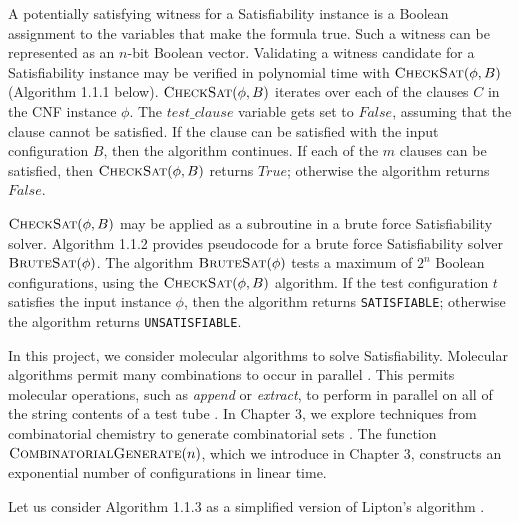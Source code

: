 A potentially satisfying witness for a {\sc Satisfiability} instance is a Boolean assignment to the variables that make the formula true.  Such a witness can be represented as an $n$-bit Boolean vector.  Validating a witness candidate for a {\sc Satisfiability} instance may be verified in polynomial time with $\text{\sc CheckSat}(\phi, B)$ (Algorithm 1.1.1 below).  $\text{\sc CheckSat}(\phi, B)$ iterates over each of the clauses $C$ in the CNF instance $\phi$.  The $test\_clause$ variable gets set to $False$, assuming that the clause cannot be satisfied.  If the clause can be satisfied with the input configuration $B$, then the algorithm continues.  If each of the $m$ clauses can be satisfied, then $\text{\sc CheckSat}(\phi, B)$ returns $True$; otherwise the algorithm returns $False$.



$\text{\sc CheckSat}(\phi, B)$ may be applied as a subroutine in a brute force {\sc Satisfiability} solver.  Algorithm 1.1.2 provides pseudocode for a brute force {\sc Satisfiability} solver $\text{\sc BruteSat}(\phi)$.  The algorithm $\text{\sc BruteSat}(\phi)$ tests a maximum of $2^n$ Boolean configurations, using the $\text{\sc CheckSat}(\phi, B)$ algorithm.  If the test configuration $t$ satisfies the input instance $\phi$, then the algorithm returns \texttt{SATISFIABLE}; otherwise the algorithm returns \texttt{UNSATISFIABLE}.

In this project, we consider molecular algorithms to solve {\sc Satisfiability}.  Molecular algorithms permit many combinations to occur in parallel \cite{Adleman:1994:MCS:189441.189442, Lipton95usingdna}.  This permits molecular operations, such as \textit{append} or \textit{extract}, to perform in parallel on all of the string contents of a test tube \cite{Adleman:1994:MCS:189441.189442, Lipton95usingdna, dnaComputingModels2008}.  In Chapter 3, we explore techniques from combinatorial chemistry to generate combinatorial sets \cite{Lipton95usingdna, furkaBook, dnaComputingModels2008}.  The function $\text{\sc CombinatorialGenerate}(n)$, which we introduce in Chapter 3, constructs an exponential number of configurations in linear time.

Let us consider Algorithm 1.1.3 as a simplified version of Lipton's algorithm \cite{Lipton95usingdna, dnaComputingModels2008}.  



